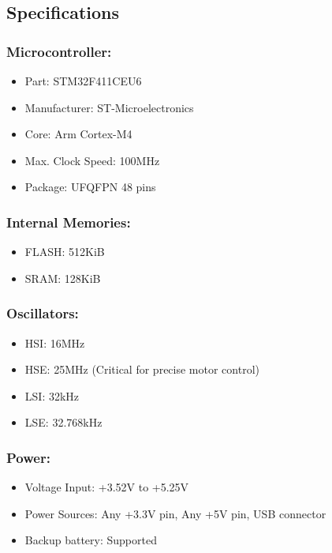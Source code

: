 \subsection{Specifications}
    \subsubsection{Microcontroller:}
    \begin{itemize}
        \item Part: STM32F411CEU6
        \item Manufacturer: ST-Microelectronics
        \item Core: Arm Cortex-M4
        \item Max. Clock Speed: 100MHz
        \item Package: UFQFPN 48 pins
    \end{itemize}

    \subsubsection{Internal Memories:}
    \begin{itemize}
        \item FLASH: 512KiB
        \item SRAM: 128KiB
    \end{itemize}

    \subsubsection{Oscillators:}
    \begin{itemize}
        \item HSI: 16MHz
        \item HSE: 25MHz (Critical for precise motor control)
        \item LSI: 32kHz
        \item LSE: 32.768kHz
    \end{itemize}

    \subsubsection{Power:}
    \begin{itemize}
        \item Voltage Input: +3.52V to +5.25V
        \item Power Sources: Any +3.3V pin, Any +5V pin, USB connector
        \item Backup battery: Supported
    \end{itemize}

